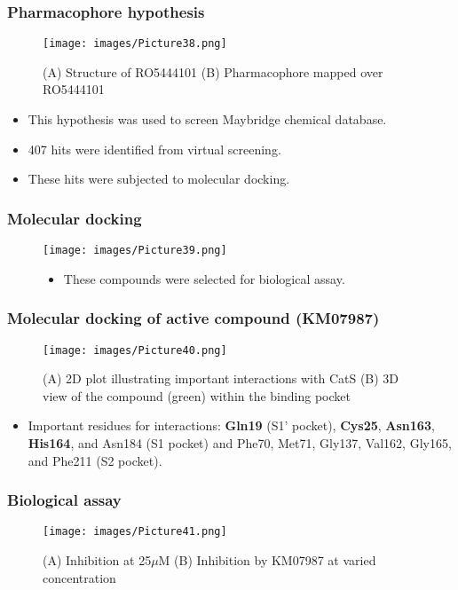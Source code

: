 \documentclass{beamer}
\begin{document}
\begin{frame}
\frametitle{\textbf{Pharmacophore hypothesis}}
\begin{figure}
\texttt{[image: images/Picture38.png]}
\caption{(A) Structure of RO5444101 (B) Pharmacophore mapped over RO5444101}
\end{figure}
\begin{itemize}
\item This hypothesis was used to screen Maybridge chemical database.
\item 407 hits were identified from virtual screening.
\item These hits were subjected to molecular docking.
\end{itemize}
\end{frame}

\begin{frame}
\frametitle{\textbf{Molecular docking}}
\begin{figure}
\texttt{[image: images/Picture39.png]}
\begin{itemize}
\item These compounds were selected for biological assay.
\end{itemize}
\end{figure}
\end{frame}

\begin{frame}
\frametitle{\textbf{Molecular docking of active compound (KM07987)}}
\begin{figure}
\texttt{[image: images/Picture40.png]}
\caption{(A) 2D plot illustrating important interactions with CatS (B) 3D view of the compound (green) within the binding pocket}
\end{figure}
\begin{itemize}
\item {\small Important residues for interactions: \textbf{Gln19} (S1’ pocket), \textbf{Cys25}, \textbf{Asn163}, \textbf{His164}, and Asn184 (S1 pocket) and Phe70, Met71, Gly137, Val162, Gly165, and Phe211 (S2 pocket)}.
\end{itemize}
\end{frame}

\begin{frame}
\frametitle{\textbf{Biological assay}}
\begin{figure}
\texttt{[image: images/Picture41.png]}
\caption{(A) Inhibition at 25$\mu$M (B) Inhibition by KM07987 at varied concentration}
\end{figure}
\end{frame}
\end{document}
